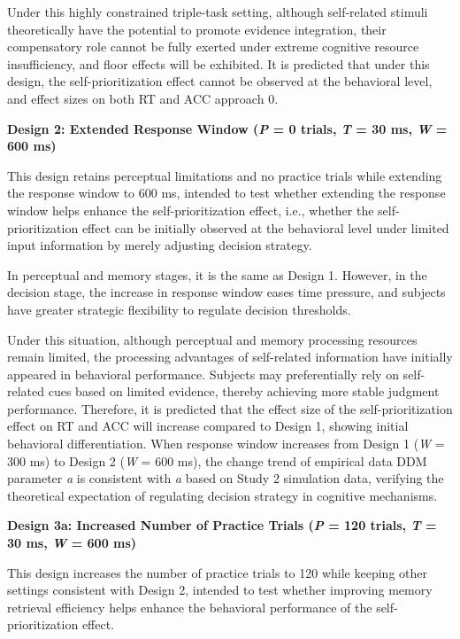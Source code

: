 \documentclass[
  english,
  man,floatsintext]{apa6}
\begin{document}
Under this highly constrained triple-task setting, although self-related stimuli theoretically have the potential to promote evidence integration, their compensatory role cannot be fully exerted under extreme cognitive resource insufficiency, and floor effects will be exhibited. It is predicted that under this design, the self-prioritization effect cannot be observed at the behavioral level, and effect sizes on both RT and ACC approach 0.

\textbf{Design 2: Extended Response Window (\emph{P} = 0 trials, \emph{T} = 30 ms, \emph{W} = 600 ms)}

This design retains perceptual limitations and no practice trials while extending the response window to 600 ms, intended to test whether extending the response window helps enhance the self-prioritization effect, i.e., whether the self-prioritization effect can be initially observed at the behavioral level under limited input information by merely adjusting decision strategy.

In perceptual and memory stages, it is the same as Design 1. However, in the decision stage, the increase in response window eases time pressure, and subjects have greater strategic flexibility to regulate decision thresholds.

Under this situation, although perceptual and memory processing resources remain limited, the processing advantages of self-related information have initially appeared in behavioral performance. Subjects may preferentially rely on self-related cues based on limited evidence, thereby achieving more stable judgment performance. Therefore, it is predicted that the effect size of the self-prioritization effect on RT and ACC will increase compared to Design 1, showing initial behavioral differentiation. When response window increases from Design 1 (\emph{W} = 300 ms) to Design 2 (\emph{W} = 600 ms), the change trend of empirical data DDM parameter \emph{a} is consistent with \emph{a} based on Study 2 simulation data, verifying the theoretical expectation of regulating decision strategy in cognitive mechanisms.

\textbf{Design 3a: Increased Number of Practice Trials (\emph{P} = 120 trials, \emph{T} = 30 ms, \emph{W} = 600 ms)}

This design increases the number of practice trials to 120 while keeping other settings consistent with Design 2, intended to test whether improving memory retrieval efficiency helps enhance the behavioral performance of the self-prioritization effect.
\end{document}
